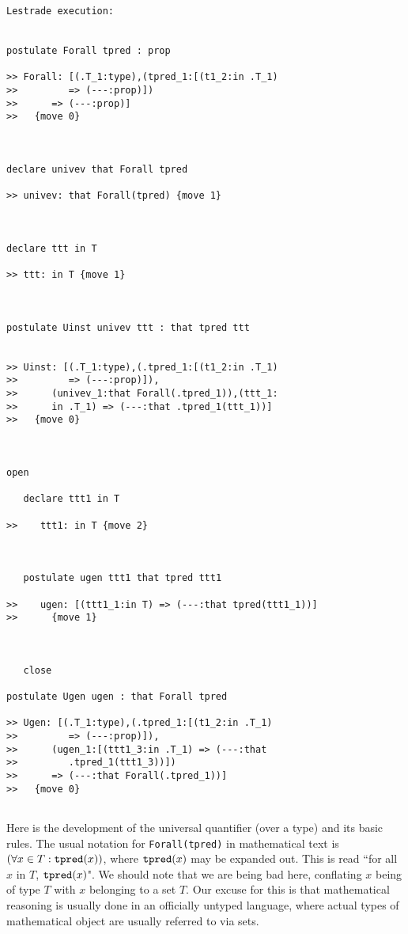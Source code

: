 \documentclass[12pt]{article}
\begin{document}
\begin{verbatim}Lestrade execution:


postulate Forall tpred : prop

>> Forall: [(.T_1:type),(tpred_1:[(t1_2:in .T_1)
>>         => (---:prop)])
>>      => (---:prop)]
>>   {move 0}



declare univev that Forall tpred

>> univev: that Forall(tpred) {move 1}



declare ttt in T

>> ttt: in T {move 1}



postulate Uinst univev ttt : that tpred ttt


>> Uinst: [(.T_1:type),(.tpred_1:[(t1_2:in .T_1)
>>         => (---:prop)]),
>>      (univev_1:that Forall(.tpred_1)),(ttt_1:
>>      in .T_1) => (---:that .tpred_1(ttt_1))]
>>   {move 0}



open

   declare ttt1 in T

>>    ttt1: in T {move 2}



   postulate ugen ttt1 that tpred ttt1

>>    ugen: [(ttt1_1:in T) => (---:that tpred(ttt1_1))]
>>      {move 1}



   close

postulate Ugen ugen : that Forall tpred

>> Ugen: [(.T_1:type),(.tpred_1:[(t1_2:in .T_1)
>>         => (---:prop)]),
>>      (ugen_1:[(ttt1_3:in .T_1) => (---:that
>>         .tpred_1(ttt1_3))])
>>      => (---:that Forall(.tpred_1))]
>>   {move 0}


\end{verbatim}

Here is the development of the universal quantifier (over a type) and its basic rules.  The usual notation for {\tt Forall(tpred)} in mathematical text is $(\forall x\in T:{\tt tpred}(x))$, where ${\tt tpred}(x)$ may be expanded out.  This is read ``for all $x$ in $T$, ${\tt tpred}(x)$".  We should note that we are being bad here, conflating $x$ being of type $T$ with $x$ belonging to a set $T$.  Our excuse for this is that mathematical reasoning is usually done in an officially untyped language, where actual types of mathematical object are usually referred to via sets.
\end{document}
